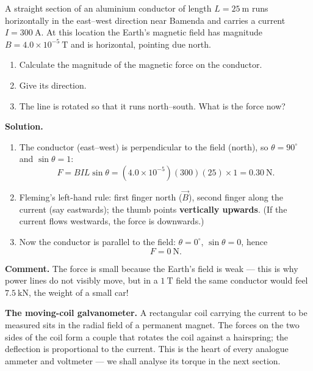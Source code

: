 \documentclass[11pt]{article}
\newcounter{popsec}
\newcounter{popsub}
\newcommand{\courssub}[1]{%
  \stepcounter{popsub}%
  \par\vspace{9pt}\noindent{\popxbold\fontsize{11.5}{13}\selectfont\color{popink}{\color{poporange}\thepopsec.\thepopsub}\hspace{6pt}#1}\par\nopagebreak\vspace{4pt}
}
\begin{document}
\begin{exoresolu}
A straight section of an aluminium conductor of length $L = 25\ \mathrm{m}$ runs horizontally in the east--west direction near Bamenda and carries a current $I = 300\ \mathrm{A}$. At this location the Earth's magnetic field has magnitude $B = 4.0\times 10^{-5}\ \mathrm{T}$ and is horizontal, pointing due north.
\begin{enumerate}
\item Calculate the magnitude of the magnetic force on the conductor.
\item Give its direction.
\item The line is rotated so that it runs north--south. What is the force now?
\end{enumerate}
\tcblower
\textbf{Solution.}
\begin{enumerate}
\item The conductor (east--west) is perpendicular to the field (north), so $\theta = 90^{\circ}$ and $\sin\theta = 1$:
\[
F = BIL\sin\theta = (4.0\times 10^{-5})(300)(25)\times 1 = 0.30\ \mathrm{N}.
\]
\item Fleming's left-hand rule: first finger north ($\vec{B}$), second finger along the current (say eastwards); the thumb points \textbf{vertically upwards}. (If the current flows westwards, the force is downwards.)
\item Now the conductor is parallel to the field: $\theta = 0^{\circ}$, $\sin\theta = 0$, hence
\[
F = 0\ \mathrm{N}.
\]
\end{enumerate}
\textbf{Comment.} The force is small because the Earth's field is weak --- this is why power lines do not visibly move, but in a $1\ \mathrm{T}$ field the same conductor would feel $7.5\ \mathrm{kN}$, the weight of a small car!
\end{exoresolu}

\courssub{Applications}

\textbf{The moving-coil galvanometer.} A rectangular coil carrying the current to be measured sits in the radial field of a permanent magnet. The forces on the two sides of the coil form a couple that rotates the coil against a hairspring; the deflection is proportional to the current. This is the heart of every analogue ammeter and voltmeter --- we shall analyse its torque in the next section.
\end{document}
